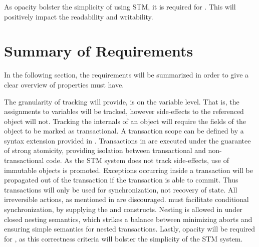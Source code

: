 As opacity bolster the simplicity of using \ac{STM}, it is required for \stmname. This will positively impact the readability and writability.

\section{Summary of Requirements}\label{sec:sum_of_req}
In the following section, the requirements will be summarized in order to give a clear overview of properties \stmnamesp must have.

The granularity of tracking \stmnamesp will provide, is on the variable level. That is, the assignments to variables will be tracked, however side-effects to the referenced object will not. Tracking the internals of an object will require the fields of the object to be marked as transactional. A transaction scope can be defined by a syntax extension provided in \stmname. Transactions in \stmnamesp are executed under the guarantee of strong atomicity, providing isolation between transactional and non-transactional code. As the \ac{STM} system does not track side-effects, use of immutable objects is promoted. Exceptions occurring inside a transaction will be propagated out of the transaction if the transaction is able to commit. Thus transactions will only be used for synchronization, not recovery of state. All irreversible actions, as mentioned in  are discouraged. \stmnamesp must facilitate conditional synchronization, by supplying the  and  constructs. Nesting is allowed in \stmnamesp under closed nesting semantics, which strikes a balance between minimizing aborts and ensuring simple semantics for nested transactions. Lastly, opacity will be required for \stmname, as this correctness criteria will bolster the simplicity of the \ac{STM} system.
\worksheetend